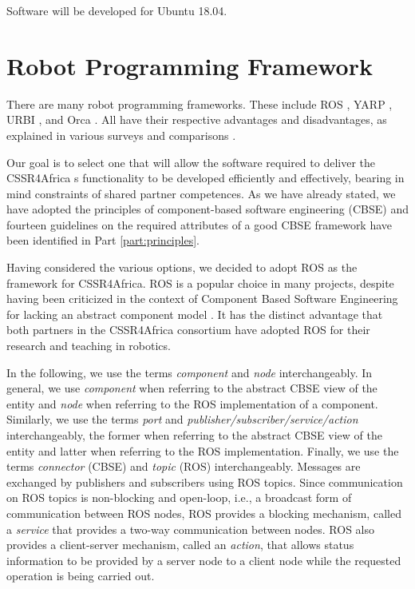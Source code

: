 \documentclass{CSSRforAfrica}
\begin{document}
Software will be developed for Ubuntu 18.04.


\section{Robot Programming Framework}
\label{section:framework}

There are many robot programming frameworks. These include ROS \cite{Quigleyetal09}, YARP \cite{MettaFitzpatrickNatale06}, URBI \cite{Baillie05}, and Orca \cite{Soetens06,Brooksetal07}.  All have their respective advantages and disadvantages, as explained in various surveys and comparisons \cite{MakarenkoBrooksKaupp07,Barakovaetal13}.  

Our goal is to select one that will allow the software required to deliver the CSSR4Africa s functionality to be developed efficiently and effectively, bearing in mind constraints of shared partner competences.  As we have already stated, we have adopted the principles of component-based software engineering (CBSE) and fourteen guidelines on the required attributes of a good CBSE framework have been  identified in Part \ref{part:principles}.  

Having considered the  various options, we decided to adopt ROS \cite{ROS} as the framework for CSSR4Africa.  ROS is a popular choice in many projects, despite having been criticized in the context of Component Based Software Engineering for lacking an abstract component model \cite{SchlegelSteckLotz2011}. It has the distinct advantage that both partners in the CSSR4Africa consortium have adopted ROS for their research and teaching in robotics.

In the following, we use the terms {\em component} and {\em node} interchangeably.  In general, we use {\em component} when referring to the  abstract CBSE view of the entity and {\em node} when referring to the ROS implementation of a component. Similarly,  we use the terms {\em port} and {\em  publisher/subscriber/service/action} interchangeably,  the former when referring to the  abstract CBSE view of the entity and latter when referring to the ROS implementation. 
Finally,  we use the terms {\em connector} (CBSE) and {\em topic} (ROS) interchangeably.  Messages are exchanged by publishers and subscribers using ROS topics.  Since communication on ROS topics is non-blocking and open-loop, i.e., a broadcast form of communication between ROS nodes, ROS provides a blocking mechanism, called a {\em service} that provides a two-way communication between nodes. ROS also provides a client-server mechanism, called an {\em action}, that allows status information to be provided by a server node to a client node while the requested operation is being carried out.
\end{document}
